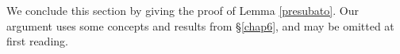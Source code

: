 We conclude this section by giving the proof of Lemma \ref{presubato}. Our argument uses some
concepts and results from \S \ref{chap6}, and may be omitted at first reading.


